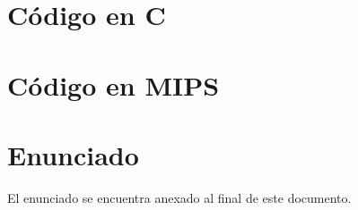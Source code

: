 \documentclass[11pt,a4paper]{article}
\begin{document}
\section{Código en C}



\section{Código en MIPS}


\section{Enunciado}
El enunciado se encuentra anexado al final de este documento.
\end{document}
